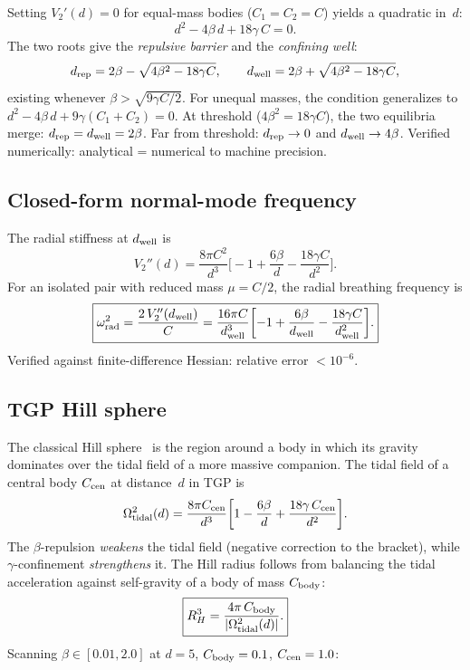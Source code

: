 \documentclass[11pt,a4paper]{article}
\newcommand{\drep}{d_{\rm rep}}
\newcommand{\dwell}{d_{\rm well}}
\begin{document}
Setting $V_2'(d) = 0$ for equal-mass bodies ($C_1 = C_2 = C$) yields a
quadratic in~$d$:
\begin{equation}
  \boxed{
  d^2 - 4\beta\,d + 18\gamma\,C = 0.
  }
  \label{eq:equilibrium-condition}
\end{equation}
The two roots give the \emph{repulsive barrier} and the \emph{confining
well}:
\begin{equation}
  \drep = 2\beta - \sqrt{4\beta^2 - 18\gamma C},
  \qquad
  \dwell = 2\beta + \sqrt{4\beta^2 - 18\gamma C},
  \label{eq:drep-dwell}
\end{equation}
existing whenever $\beta > \sqrt{9\gamma C/2}$.  For unequal masses, the
condition generalizes to $d^2 - 4\beta\,d + 9\gamma(C_1+C_2) = 0$.
At threshold ($4\beta^2 = 18\gamma C$), the two equilibria merge:
$\drep = \dwell = 2\beta$.  Far from threshold: $\drep \to 0$ and
$\dwell \to 4\beta$.  Verified numerically: analytical = numerical to
machine precision.

\subsection{Closed-form normal-mode frequency}

The radial stiffness at $\dwell$ is
\begin{equation}
  V_2''(d) = \frac{8\pi C^2}{d^3}
    \biggl[-1 + \frac{6\beta}{d} - \frac{18\gamma C}{d^2}\biggr].
  \label{eq:V2pp}
\end{equation}
For an isolated pair with reduced mass $\mu = C/2$, the radial breathing
frequency is
\begin{equation}
  \boxed{
  \omega_{\rm rad}^2 = \frac{2\,V_2''(\dwell)}{C}
  = \frac{16\pi C}{\dwell^3}
    \biggl[-1 + \frac{6\beta}{\dwell} - \frac{18\gamma C}{\dwell^2}\biggr].
  }
  \label{eq:omega-rad}
\end{equation}
Verified against finite-difference Hessian: relative error $<10^{-6}$.

\subsection{TGP Hill sphere}

The classical Hill sphere~\citep{Murray1999,Hamilton1992} is the region
around a body in which its gravity dominates over the tidal field of
a more massive companion.
The tidal field of a central body $C_{\rm cen}$ at distance~$d$ in TGP is
\begin{equation}
  \Omega_{\rm tidal}^2(d)
  = \frac{8\pi C_{\rm cen}}{d^3}
    \biggl[1 - \frac{6\beta}{d} + \frac{18\gamma\,C_{\rm cen}}{d^2}\biggr].
  \label{eq:tidal}
\end{equation}
The $\beta$-repulsion \emph{weakens} the tidal field (negative correction to
the bracket), while $\gamma$-confinement \emph{strengthens} it.  The Hill
radius follows from balancing the tidal acceleration against self-gravity
of a body of mass $C_{\rm body}$:
\begin{equation}
  \boxed{
  R_H^3 = \frac{4\pi\,C_{\rm body}}{|\Omega_{\rm tidal}^2(d)|}.
  }
  \label{eq:hill}
\end{equation}
Scanning $\beta \in [0.01, 2.0]$ at $d = 5$, $C_{\rm body} = 0.1$,
$C_{\rm cen} = 1.0$:
\end{document}
